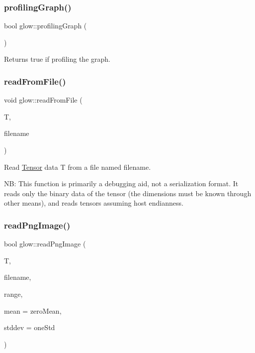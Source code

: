 \subsubsection{\texorpdfstring{profiling\+Graph()}{profilingGraph()}}
{\footnotesize\ttfamily bool glow\+::profiling\+Graph (\begin{DoxyParamCaption}{ }\end{DoxyParamCaption})}

\begin{DoxyReturn}{Returns}
true if profiling the graph. 
\end{DoxyReturn}
\mbox{\label{namespaceglow_a327fb998231805cf69b6753e763e683f}} 
\subsubsection{\texorpdfstring{read\+From\+File()}{readFromFile()}}
{\footnotesize\ttfamily void glow\+::read\+From\+File (\begin{DoxyParamCaption}\item[{\hyperlink{classglow_1_1_tensor}{Tensor} \&}]{T,  }\item[{llvm\+::\+String\+Ref}]{filename }\end{DoxyParamCaption})}

Read \hyperlink{classglow_1_1_tensor}{Tensor} data {\ttfamily T} from a file named {\ttfamily filename}.

NB\+: This function is primarily a debugging aid, not a serialization format. It reads only the binary data of the tensor (the dimensions must be known through other means), and reads tensors assuming host endianness. \mbox{\label{namespaceglow_a23bf5dcbdf3e69fcee124d73bc4ecace}} 
\subsubsection{\texorpdfstring{read\+Png\+Image()}{readPngImage()}}
{\footnotesize\ttfamily bool glow\+::read\+Png\+Image (\begin{DoxyParamCaption}\item[{\hyperlink{classglow_1_1_tensor}{Tensor} $\ast$}]{T,  }\item[{const char $\ast$}]{filename,  }\item[{std\+::pair$<$ float, float $>$}]{range,  }\item[{llvm\+::\+Array\+Ref$<$ float $>$}]{mean = {\ttfamily zeroMean},  }\item[{llvm\+::\+Array\+Ref$<$ float $>$}]{stddev = {\ttfamily oneStd} }\end{DoxyParamCaption})}

